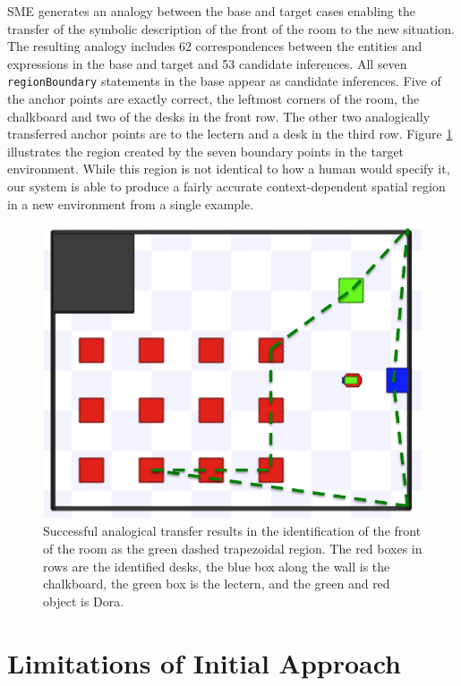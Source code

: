 \documentclass[letterpaper]{article}
\newcommand{\fw}[1]{\texttt{#1}}
\begin{document}
SME generates an analogy between the base and target cases enabling the transfer of the symbolic description of the front of the room to the new situation. The resulting analogy includes 62 correspondences between the entities and expressions in the base and target and 53 candidate inferences.  All seven \fw{regionBoundary} statements in the base appear as candidate inferences. Five of the anchor points are exactly correct, the leftmost corners of the room, the chalkboard and two of the desks in the front row. The other two analogically transferred anchor points are to the lectern and a desk in the third row. Figure \ref{fig:success} illustrates the region created by the seven boundary points in the target environment. While this region is not identical to how a human would specify it, our system is able to produce a fairly accurate context-dependent spatial region in a new environment from a single example.

\begin{figure}[h]
  \includegraphics[width=\columnwidth]{images/target-success.png}
  \caption{Successful analogical transfer results in the identification of the front of the room as the green dashed trapezoidal region. The red boxes in rows are the identified desks, the blue box along the wall is the chalkboard, the green box is the lectern, and the green and red object is Dora.}
  \label{fig:success}
\end{figure}

\section{Limitations of Initial Approach}
\end{document}
